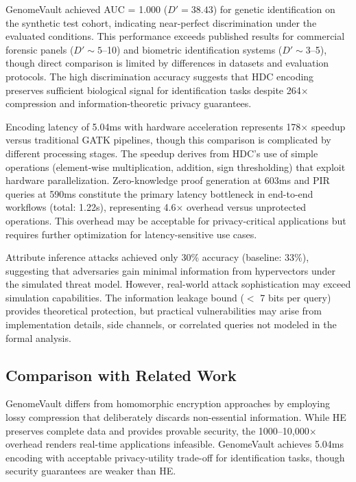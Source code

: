 \documentclass[11pt,letterpaper]{article}
\begin{document}
GenomeVault achieved AUC = 1.000 ($D' = 38.43$) for genetic identification on the synthetic test cohort, indicating near-perfect discrimination under the evaluated conditions. This performance exceeds published results for commercial forensic panels ($D' \sim 5$--10) and biometric identification systems ($D' \sim 3$--5), though direct comparison is limited by differences in datasets and evaluation protocols. The high discrimination accuracy suggests that HDC encoding preserves sufficient biological signal for identification tasks despite 264$\times$ compression and information-theoretic privacy guarantees.

Encoding latency of 5.04ms with hardware acceleration represents 178$\times$ speedup versus traditional GATK pipelines, though this comparison is complicated by different processing stages. The speedup derives from HDC's use of simple operations (element-wise multiplication, addition, sign thresholding) that exploit hardware parallelization. Zero-knowledge proof generation at 603ms and PIR queries at 590ms constitute the primary latency bottleneck in end-to-end workflows (total: 1.22s), representing 4.6$\times$ overhead versus unprotected operations. This overhead may be acceptable for privacy-critical applications but requires further optimization for latency-sensitive use cases.

Attribute inference attacks achieved only 30\% accuracy (baseline: 33\%), suggesting that adversaries gain minimal information from hypervectors under the simulated threat model. However, real-world attack sophistication may exceed simulation capabilities. The information leakage bound ($<$ 7 bits per query) provides theoretical protection, but practical vulnerabilities may arise from implementation details, side channels, or correlated queries not modeled in the formal analysis.

\subsection{Comparison with Related Work}

GenomeVault differs from homomorphic encryption approaches by employing lossy compression that deliberately discards non-essential information. While HE preserves complete data and provides provable security, the 1000--10,000$\times$ overhead renders real-time applications infeasible. GenomeVault achieves 5.04ms encoding with acceptable privacy-utility trade-off for identification tasks, though security guarantees are weaker than HE.
\end{document}
